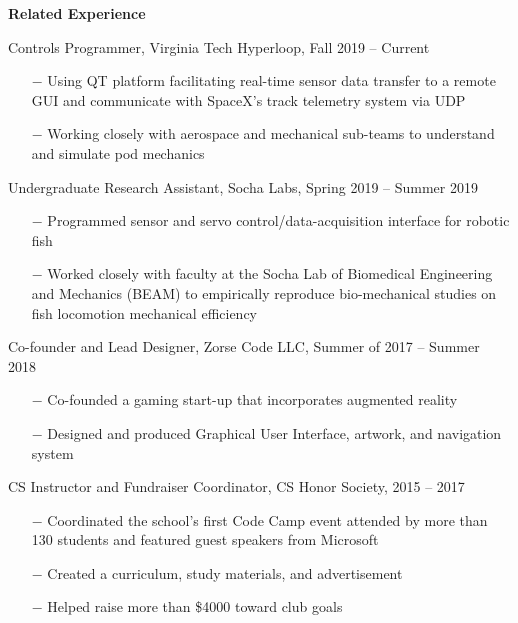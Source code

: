 \documentclass{article}
\begin{document}
\vline

\textbf{\large{Related Experience}} 

\vspace{5pt}

{\setlength{\leftskip}{15pt}

{\selectfont Controls Programmer, Virginia Tech Hyperloop, Fall 2019 – Current}
\vspace{-5pt}
\begin{itemize}
	\setlength{\leftskip}{15pt}
	\setlength\itemsep{-0.5em}
	\item[$-$] Using QT platform facilitating real-time sensor data transfer to a remote GUI and communicate with SpaceX's track telemetry system via UDP
	\item[$-$] Working closely with aerospace and mechanical sub-teams to understand and simulate pod mechanics
\end{itemize}

{\selectfont Undergraduate Research Assistant, Socha Labs, Spring 2019 – Summer 2019}
\vspace{-5pt}
\begin{itemize}
	\setlength{\leftskip}{15pt}
	\setlength\itemsep{-0.5em}
	\item[$-$] Programmed sensor and servo control/data-acquisition interface for robotic fish
	\item[$-$] Worked closely with faculty at the Socha Lab of Biomedical Engineering and Mechanics (BEAM) to empirically reproduce bio-mechanical studies on fish locomotion mechanical efficiency
\end{itemize}

{\selectfont Co-founder and Lead Designer, Zorse Code LLC, Summer of 2017 – Summer 2018}
\vspace{-5pt}
\begin{itemize}
	\setlength{\leftskip}{15pt}
	\setlength\itemsep{-0.5em}
	\item[$-$] Co-founded a gaming start-up that incorporates augmented reality 
	\item[$-$] Designed and produced Graphical User Interface, artwork, and navigation system
\end{itemize}

{\selectfont CS Instructor and Fundraiser Coordinator, CS Honor Society, 2015 – 2017}
\vspace{-5pt}
\begin{itemize}
	\setlength{\leftskip}{15pt}
	\setlength\itemsep{-0.5em}
	\item[$-$] Coordinated the school’s first Code Camp event attended by more than 130 students and featured guest speakers from Microsoft
	\item[$-$] Created a curriculum, study materials, and advertisement
	\item[$-$] Helped raise more than \$4000 toward club goals
\end{itemize}	
}
\end{document}
